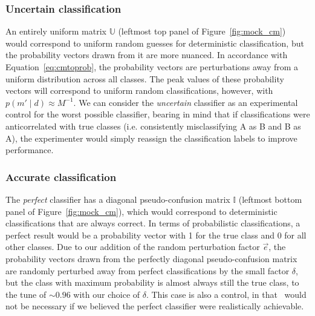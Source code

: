 \subsubsection{Uncertain classification}
\label{sec:uncertaindata}

An entirely uniform  matrix $\mathbb{U}$ (leftmost top panel of Figure~\ref{fig:mock_cm}) would correspond to uniform random guesses for deterministic classification, but the probability vectors drawn from it are more nuanced.
In accordance with Equation~\ref{eq:cmtoprob}, the probability vectors are perturbations away from a uniform distribution across all classes.
The peak values of these probability vectors will correspond to uniform random classifications, however, with $p(m' \mid d)\approx M^{-1}$.
We can consider the \textit{uncertain} classifier as an experimental control for the worst possible classifier, bearing in mind that if classifications were anticorrelated with true classes (i.e. consistently misclassifying A as B and B as A), the experimenter would simply reassign the classification labels to improve performance.

\subsubsection{Accurate classification}
\label{sec:accuratedata}

The \textit{perfect} classifier has a diagonal pseudo-confusion matrix $\mathbb{I}$ (leftmost bottom panel of Figure~\ref{fig:mock_cm}), which would correspond to deterministic classifications that are always correct.
In terms of probabilistic classifications, a perfect result would be a probability vector with 1 for the true class and 0 for all other classes.
Due to our addition of the random perturbation factor $\vec{e}$, the probability vectors drawn from the perfectly diagonal pseudo-confusion matrix are randomly perturbed away from perfect classifications by the small factor $\delta$, but the class with maximum probability is almost always still the true class, to the tune of $\sim0.96$ with our choice of $\delta$.
This case is also a control, in that \plasticc\ would not be necessary if we believed the perfect classifier were realistically achievable.

